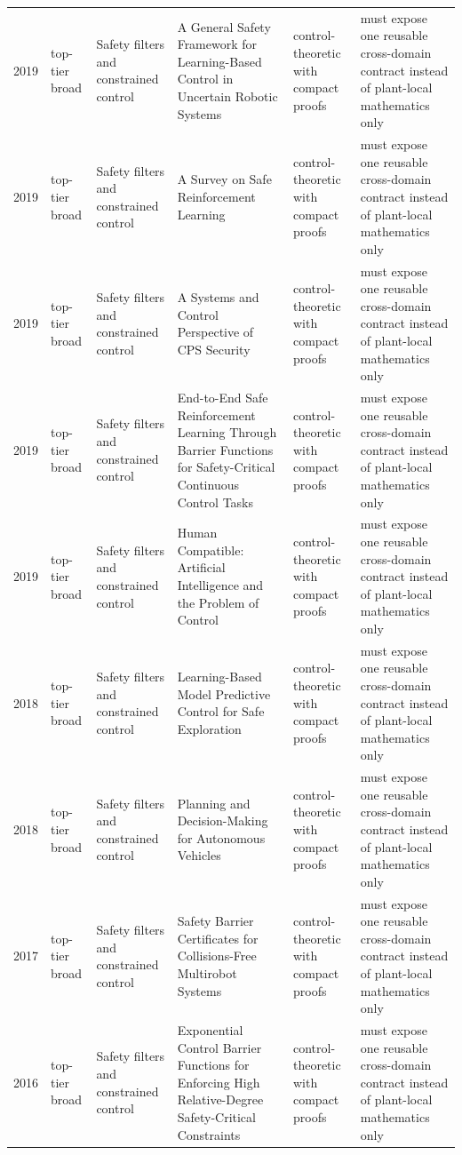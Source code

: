 \begin{longtable}{p{}p{}p{}p{}p{}p{}}
2019 & top-tier broad & Safety filters and constrained control & A General Safety Framework for Learning-Based Control in Uncertain Robotic Systems & control-theoretic with compact proofs & must expose one reusable cross-domain contract instead of plant-local mathematics only\\
2019 & top-tier broad & Safety filters and constrained control & A Survey on Safe Reinforcement Learning & control-theoretic with compact proofs & must expose one reusable cross-domain contract instead of plant-local mathematics only\\
2019 & top-tier broad & Safety filters and constrained control & A Systems and Control Perspective of CPS Security & control-theoretic with compact proofs & must expose one reusable cross-domain contract instead of plant-local mathematics only\\
2019 & top-tier broad & Safety filters and constrained control & End-to-End Safe Reinforcement Learning Through Barrier Functions for Safety-Critical Continuous Control Tasks & control-theoretic with compact proofs & must expose one reusable cross-domain contract instead of plant-local mathematics only\\
2019 & top-tier broad & Safety filters and constrained control & Human Compatible: Artificial Intelligence and the Problem of Control & control-theoretic with compact proofs & must expose one reusable cross-domain contract instead of plant-local mathematics only\\
2018 & top-tier broad & Safety filters and constrained control & Learning-Based Model Predictive Control for Safe Exploration & control-theoretic with compact proofs & must expose one reusable cross-domain contract instead of plant-local mathematics only\\
2018 & top-tier broad & Safety filters and constrained control & Planning and Decision-Making for Autonomous Vehicles & control-theoretic with compact proofs & must expose one reusable cross-domain contract instead of plant-local mathematics only\\
2017 & top-tier broad & Safety filters and constrained control & Safety Barrier Certificates for Collisions-Free Multirobot Systems & control-theoretic with compact proofs & must expose one reusable cross-domain contract instead of plant-local mathematics only\\
2016 & top-tier broad & Safety filters and constrained control & Exponential Control Barrier Functions for Enforcing High Relative-Degree Safety-Critical Constraints & control-theoretic with compact proofs & must expose one reusable cross-domain contract instead of plant-local mathematics only\\

\end{longtable}
